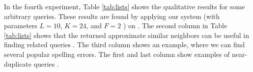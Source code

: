 In the fourth experiment, Table \ref{tab:lists} shows the qualitative results for some arbitrary queries. These results are found by applying our
system (\dflipb with parameters $L=10$, $K=24$, and $F=2$ ) on \dataC. The second column in Table \ref{tab:lists} shows that the returned approximate 
similar neighbors can be useful in finding related queries \cite{Jones06WWW,Jain11SIGIR}. 
The third column shows an example, where we can find several popular spelling errors. 
The first and last column show examples of near-duplicate queries \cite{leeCIKM11}.  






